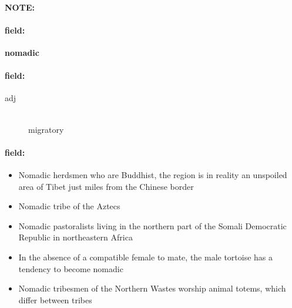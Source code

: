 \documentclass[12pt]{article}
\newenvironment{note}{\paragraph{NOTE:}}{}
\newenvironment{field}{\paragraph{field:}}{}
\begin{document}
\begin{note}
\begin{field}
\textbf{\large nomadic}
\end{field}


\begin{field}
\begin{description}
\item[adj] \hfill \\ 
migratory

\end{description}
\end{field}

\begin{field}
\begin{itemize}
\item Nomadic herdsmen who are Buddhist, the region is in reality an unspoiled area of Tibet just miles from the Chinese border
\item Nomadic tribe of the Aztecs
\item Nomadic pastoralists living in the northern part of the Somali Democratic Republic in northeastern Africa
\item In the absence of a compatible female to mate, the male tortoise has a tendency to become nomadic
\item Nomadic tribesmen of the Northern Wastes worship animal totems, which differ between tribes
\end{itemize}
\end{field}
\end{note}
\end{document}
